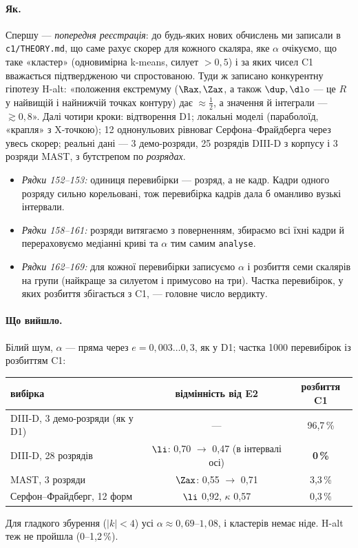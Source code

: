 \paragraph{Як.} Спершу --- \emph{попередня реєстрація}: до будь-яких нових обчислень ми
записали в \texttt{c1/THEORY.md}, що саме рахує скорер для кожного скаляра, яке $\alpha$
очікуємо, що таке «кластер» (одновимірна k-means, силует $>0{,}5$) і за яких чисел C1
вважається підтвердженою чи спростованою. Туди ж записано конкурентну гіпотезу H-alt:
«положення екстремуму ($\Rax,\Zax$, а також $\dup,\dlo$ --- це $R$ у найвищій і найнижчій
точках контуру) дає $\approx\tfrac12$, а значення й інтеграли --- $\gtrsim0{,}8$». Далі чотири
кроки: відтворення D1; локальні моделі (параболоїд, «крапля» з X-точкою); 12 однонульових
рівноваг Серфона--Фрайдберга \cite{Cerfon2010} через увесь скорер; реальні дані --- 3 демо-розряди,
25 розрядів DIII-D з корпусу \cite{FEC} і 3 розряди MAST, з бутстрепом по \emph{розрядах}.


\begin{itemize}
\item \emph{Рядки 152--153:} одиниця перевибірки --- розряд, а не кадр. Кадри одного розряду
  сильно корельовані, тож перевибірка кадрів дала б оманливо вузькі інтервали.
\item \emph{Рядки 158--161:} розряди витягаємо з поверненням, збираємо всі їхні кадри й
  перераховуємо медіанні криві та $\alpha$ тим самим \texttt{analyse}.
\item \emph{Рядки 162--169:} для кожної перевибірки записуємо $\alpha$ і розбиття семи
  скалярів на групи (найкраще за силуетом і примусово на три). Частка перевибірок, у
  яких розбиття збігається з C1, --- головне число вердикту.
\end{itemize}

\paragraph{Що вийшло.} Білий шум, $\alpha$ --- пряма через $e=0{,}003\ldots0{,}3$, як у D1;
частка 1000 перевибірок із розбиттям C1:
\begin{center}\small
\begin{tabular}{@{}lcc@{}}
\toprule
вибірка & відмінність від E2 & розбиття C1 \\
\midrule
DIII-D, 3 демо-розряди (як у D1) & --- & 96,7\,\% \\
DIII-D, 28 розрядів & $\li$: 0,70 $\to$ 0,47 (в інтервалі осі) & \textbf{0\,\%} \\
MAST, 3 розряди & $\Zax$: 0,55 $\to$ 0,71 & 3,3\,\% \\
Серфон--Фрайдберг, 12 форм & $\li$ 0,92, $\kappa$ 0,57 & 0,3\,\% \\
\bottomrule
\end{tabular}
\end{center}
Для гладкого збурення ($|k|<4$) усі $\alpha\approx0{,}69\text{--}1{,}08$, і кластерів немає ніде.
H-alt теж не пройшла (0--1,2\,\%).


